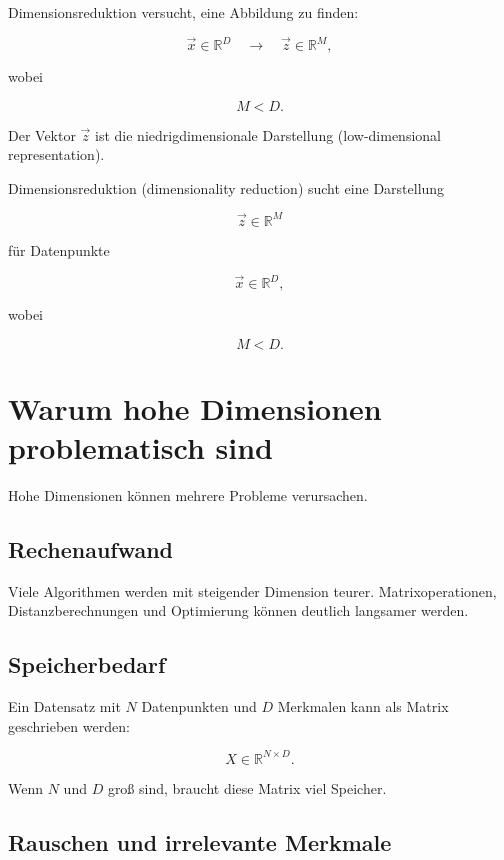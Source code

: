 Dimensionsreduktion versucht, eine Abbildung zu finden:

\[
    \vec{x}
    \in
    \mathbb{R}^D
    \quad
    \longrightarrow
    \quad
    \vec{z}
    \in
    \mathbb{R}^M,
\]

wobei

\[
    M < D.
\]

Der Vektor \(\vec{z}\) ist die niedrigdimensionale Darstellung (low-dimensional representation).

\begin{definitionbox}
Dimensionsreduktion (dimensionality reduction) sucht eine Darstellung

\[
    \vec{z}\in\mathbb{R}^M
\]

für Datenpunkte

\[
    \vec{x}\in\mathbb{R}^D,
\]

wobei

\[
    M<D.
\]
\end{definitionbox}

\section{Warum hohe Dimensionen problematisch sind}

Hohe Dimensionen können mehrere Probleme verursachen.

\subsection{Rechenaufwand}

Viele Algorithmen werden mit steigender Dimension teurer.
Matrixoperationen, Distanzberechnungen und Optimierung können deutlich langsamer werden.

\subsection{Speicherbedarf}

Ein Datensatz mit \(N\) Datenpunkten und \(D\) Merkmalen kann als Matrix geschrieben werden:

\[
    X \in \mathbb{R}^{N\times D}.
\]

Wenn \(N\) und \(D\) groß sind, braucht diese Matrix viel Speicher.

\subsection{Rauschen und irrelevante Merkmale}

